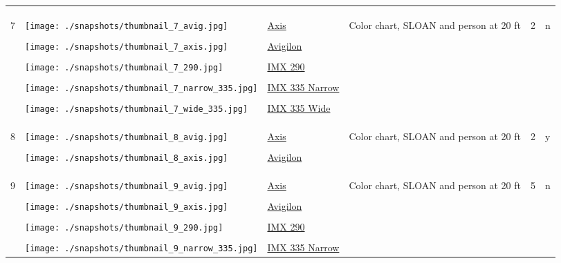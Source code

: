 \documentclass{article}%
\begin{document}
\begin{longtabu}{m{2.5cm} m{4cm} m{2cm} m{4cm} m{2cm} m{2cm}}
&&&&&\\%
&&&&&\\%
\hline%
&&&&&\\%
7&\texttt{[image: ./snapshots/thumbnail\_7\_avig.jpg]}&\href{https://google.com}{Axis}&Color chart, SLOAN and person at 20 ft&2&n\\%
&&&&&\\%
&\texttt{[image: ./snapshots/thumbnail\_7\_axis.jpg]}&\href{https://google.com}{Avigilon}&&&\\%
&&&&&\\%
&\texttt{[image: ./snapshots/thumbnail\_7\_290.jpg]}&\href{https://google.com}{IMX 290}&&&\\%
&&&&&\\%
&\texttt{[image: ./snapshots/thumbnail\_7\_narrow\_335.jpg]}&\href{https://google.com}{IMX 335 Narrow}&&&\\%
&&&&&\\%
&\texttt{[image: ./snapshots/thumbnail\_7\_wide\_335.jpg]}&\href{https://google.com}{IMX 335 Wide}&&&\\%
&&&&&\\%
&&&&&\\%
\hline%
&&&&&\\%
8&\texttt{[image: ./snapshots/thumbnail\_8\_avig.jpg]}&\href{https://google.com}{Axis}&Color chart, SLOAN and person at 20 ft&2&y\\%
&&&&&\\%
&\texttt{[image: ./snapshots/thumbnail\_8\_axis.jpg]}&\href{https://google.com}{Avigilon}&&&\\%
&&&&&\\%
&&&&&\\%
\hline%
&&&&&\\%
9&\texttt{[image: ./snapshots/thumbnail\_9\_avig.jpg]}&\href{https://google.com}{Axis}&Color chart, SLOAN and person at 20 ft&5&n\\%
&&&&&\\%
&\texttt{[image: ./snapshots/thumbnail\_9\_axis.jpg]}&\href{https://google.com}{Avigilon}&&&\\%
&&&&&\\%
&\texttt{[image: ./snapshots/thumbnail\_9\_290.jpg]}&\href{https://google.com}{IMX 290}&&&\\%
&&&&&\\%
&\texttt{[image: ./snapshots/thumbnail\_9\_narrow\_335.jpg]}&\href{https://google.com}{IMX 335 Narrow}&&&\\%

\end{longtabu}
\end{document}
